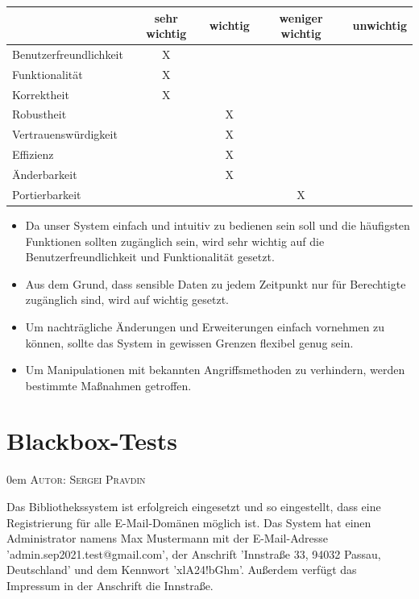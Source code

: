 \documentclass{article}
\makeatletter
\newcommand{\sectionauthor}[1]{
	{\parindent 0em \large \scshape Autor: #1 \par \nobreak \vspace*{2em}}
	\@afterheading
}
\makeatother
\begin{document}
\begin{center}
\begin{tabular}{ |l||c|c|c|c| }
 \hline
  & sehr wichtig & wichtig & weniger wichtig & unwichtig \\
 \hline\hline
 Benutzerfreundlichkeit & X & & & \\
 \hline
 Funktionalität & X & & & \\
 \hline
 Korrektheit & X & & & \\
 \hline
 Robustheit & & X & & \\
 \hline
 Vertrauenswürdigkeit & & X & & \\
 \hline
 Effizienz & & X & & \\
 \hline
 Änderbarkeit & & X & & \\
 \hline
 Portierbarkeit & &   & X & \\

 \hline
\end{tabular}
\end{center}
\begin{itemize}
\item Da  unser System einfach und intuitiv zu bedienen sein soll und die häufigsten Funktionen sollten
 zugänglich sein, wird sehr wichtig  auf die Benutzerfreundlichkeit und Funktionalität gesetzt.
\item Aus dem Grund, dass sensible Daten zu jedem Zeitpunkt nur für Berechtigte zugänglich sind, wird auf  wichtig gesetzt.
\item Um nachträgliche Änderungen und Erweiterungen einfach vornehmen zu können,
sollte das System in gewissen Grenzen flexibel genug sein.
\item Um Manipulationen mit bekannten Angriffsmethoden zu verhindern, werden bestimmte Maßnahmen getroffen.
\end{itemize}
\section{Blackbox-Tests} %
\sectionauthor{Sergei Pravdin}
Das Bibliothekssystem ist erfolgreich eingesetzt und so eingestellt, dass eine Registrierung für alle E-Mail-Domänen möglich ist. Das System hat einen Administrator namens Max Mustermann mit der E-Mail-Adresse 'admin.sep2021.test@gmail.com', der Anschrift 'Innstraße 33, 94032 Passau, Deutschland' und dem Kennwort 'xlA24!bGhm'. Außerdem verfügt das Impressum in der Anschrift die Innstraße. \vspace{0.5em}
\end{document}

